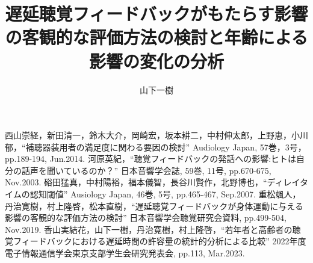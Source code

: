 \documentclass[twocolumn]{jsarticle}
\title{遅延聴覚フィードバックがもたらす影響の客観的な評価方法の検討と年齢による影響の変化の分析}
\author{山下\hspace{1zw}一樹}
\begin{document}
\maketitle


% 






\begin{thebibliography}{99}
	西山崇経，新田清一，鈴木大介，岡崎宏，坂本耕二，中村伸太郎，上野恵，小川郁，``補聴器装用者の満足度に関わる要因の検討'' Audiology Japan, 57巻，3号，pp.189-194, Jun.2014.
	河原英紀，``聴覚フィードバックの発話への影響:ヒトは自分の話声を聞いているのか？'' 日本音響学会誌, 59巻, 11号, pp.670-675, Nov.2003.
	硲田猛真，中村陽裕，福本儀智，長谷川賢作，北野博也，``ディレイタイムの認知閾値'' Ausiology Japan, 46巻, 5号, pp.465-467, Sep.2007.
	重松颯人，丹治寛樹，村上隆啓，松本直樹，``遅延聴覚フィードバックが身体運動に与える影響の客観的な評価方法の検討'' 日本音響学会聴覚研究会資料, pp.499-504, Nov.2019.
	香山実結花，山下一樹，丹治寛樹，村上隆啓，``若年者と高齢者の聴覚フィードバックにおける遅延時間の許容量の統計的分析による比較'' 2022年度電子情報通信学会東京支部学生会研究発表会, pp.113, Mar.2023.
\end{thebibliography}

\end{document}
